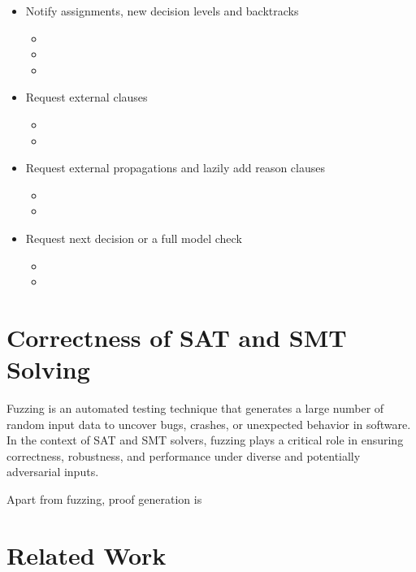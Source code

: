 \begin{itemize}
  \item Notify assignments, new decision levels and backtracks
    \begin{itemize}
      \item {}
      \item {}
      \item {}
    \end{itemize}
  \item Request external clauses
    \begin{itemize}
      \item {}
      \item {}
    \end{itemize}
  \item Request external propagations and lazily add reason clauses
    \begin{itemize}
      \item {}
      \item {}
    \end{itemize}
  \item Request next decision or a full model check
    \begin{itemize}
      \item {}
      \item {}
    \end{itemize}
\end{itemize}

\section{Correctness of SAT and SMT Solving}

Fuzzing is an automated testing technique that generates a large number of random input data to uncover bugs, crashes, or unexpected behavior in software. In the context of SAT and SMT solvers, fuzzing plays a critical role in ensuring correctness, robustness, and performance under diverse and potentially adversarial inputs.

Apart from fuzzing, proof generation is 

\section{Related Work}


